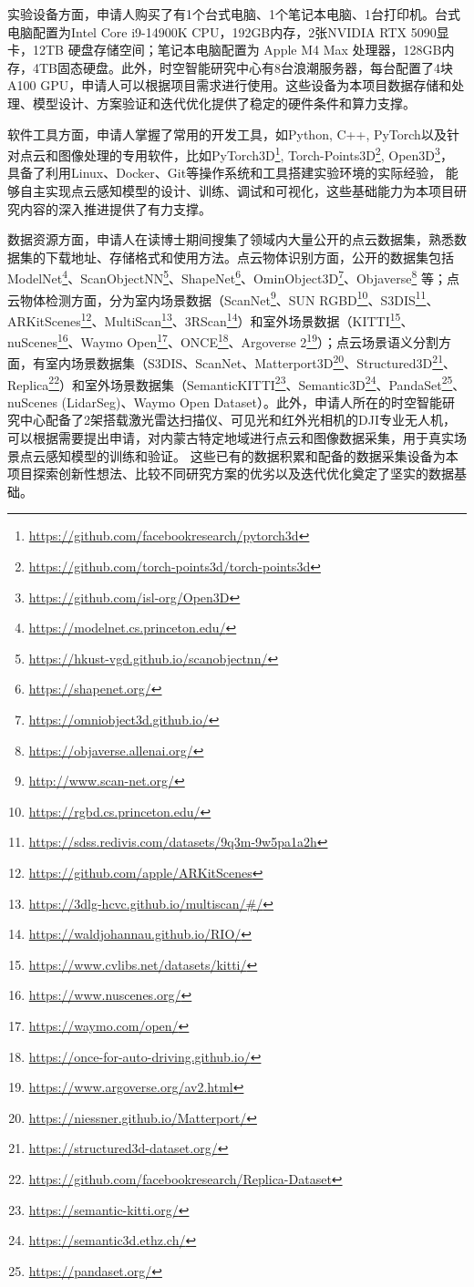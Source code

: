 \documentclass[12pt]{article}
\begin{document}
实验设备方面，申请人购买了有1个台式电脑、1个笔记本电脑、1台打印机。台式电脑配置为Intel Core i9-14900K CPU，192GB内存，2张NVIDIA RTX 5090显卡，12TB 硬盘存储空间；笔记本电脑配置为 Apple M4 Max 处理器，128GB内存，4TB固态硬盘。此外，时空智能研究中心有8台浪潮服务器，每台配置了4块 A100 GPU，申请人可以根据项目需求进行使用。这些设备为本项目数据存储和处理、模型设计、方案验证和迭代优化提供了稳定的硬件条件和算力支撑。

软件工具方面，申请人掌握了常用的开发工具，如Python, C++, PyTorch以及针对点云和图像处理的专用软件，比如PyTorch3D\footnote{\url{https://github.com/facebookresearch/pytorch3d}}, Torch-Points3D\footnote{\url{https://github.com/torch-points3d/torch-points3d}}, Open3D\footnote{\url{https://github.com/isl-org/Open3D}}，
具备了利用Linux、Docker、Git等操作系统和工具搭建实验环境的实际经验，
能够自主实现点云感知模型的设计、训练、调试和可视化，这些基础能力为本项目研究内容的深入推进提供了有力支撑。

数据资源方面，申请人在读博士期间搜集了领域内大量公开的点云数据集，熟悉数据集的下载地址、存储格式和使用方法。点云物体识别方面，公开的数据集包括 ModelNet\footnote{\url{https://modelnet.cs.princeton.edu/}}、ScanObjectNN\footnote{\url{https://hkust-vgd.github.io/scanobjectnn/}}、ShapeNet\footnote{\url{https://shapenet.org/}}、OminObject3D\footnote{\url{https://omniobject3d.github.io/}}、Objaverse\footnote{\url{https://objaverse.allenai.org/}} 等；点云物体检测方面，分为室内场景数据（ScanNet\footnote{\url{http://www.scan-net.org/}}、SUN RGBD\footnote{\url{https://rgbd.cs.princeton.edu/}}、S3DIS\footnote{\url{https://sdss.redivis.com/datasets/9q3m-9w5pa1a2h}}、ARKitScenes\footnote{\url{https://github.com/apple/ARKitScenes}}、MultiScan\footnote{\url{https://3dlg-hcvc.github.io/multiscan/\#/}}、3RScan\footnote{\url{https://waldjohannau.github.io/RIO/}}）和室外场景数据（KITTI\footnote{\url{https://www.cvlibs.net/datasets/kitti/}}、nuScenes\footnote{\url{https://www.nuscenes.org/}}、Waymo Open\footnote{\url{https://waymo.com/open/}}、ONCE\footnote{\url{https://once-for-auto-driving.github.io/}}、Argoverse 2\footnote{\url{https://www.argoverse.org/av2.html}}）；点云场景语义分割方面，有室内场景数据集（S3DIS、ScanNet、Matterport3D\footnote{\url{https://niessner.github.io/Matterport/}}、Structured3D\footnote{\url{https://structured3d-dataset.org/}}、Replica\footnote{\url{https://github.com/facebookresearch/Replica-Dataset}}）和室外场景数据集（SemanticKITTI\footnote{\url{https://semantic-kitti.org/}}、Semantic3D\footnote{\url{https://semantic3d.ethz.ch/}}、PandaSet\footnote{\url{https://pandaset.org/}}、nuScenes (LidarSeg)、Waymo Open Dataset）。此外，申请人所在的时空智能研究中心配备了2架搭载激光雷达扫描仪、可见光和红外光相机的DJI专业无人机，可以根据需要提出申请，对内蒙古特定地域进行点云和图像数据采集，用于真实场景点云感知模型的训练和验证。
这些已有的数据积累和配备的数据采集设备为本项目探索创新性想法、比较不同研究方案的优劣以及迭代优化奠定了坚实的数据基础。
\end{document}
